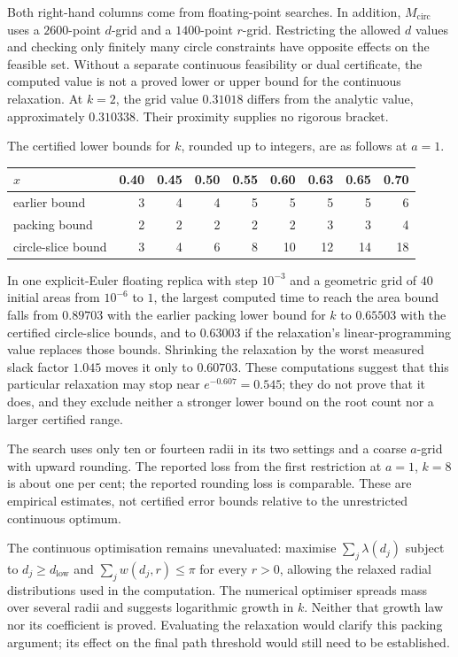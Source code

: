 \documentclass[11pt]{article}
\begin{document}
Both right-hand columns come from floating-point searches. In addition,
$M_{\mathrm{circ}}$ uses a $2600$-point $d$-grid and a $1400$-point
$r$-grid. Restricting the allowed $d$ values and checking only finitely
many circle constraints have opposite effects on the feasible set.
Without a separate continuous feasibility or dual certificate, the
computed value is not a proved lower or upper bound for the continuous
relaxation. At $k=2$, the grid value $0.31018$ differs from the analytic
value, approximately $0.310338$. Their proximity supplies no rigorous
bracket.

The certified lower bounds for $k$, rounded up to integers, are as
follows at $a=1$.

\begin{center}
\begin{tabular}{@{}lrrrrrrrr@{}}
\toprule
$x$ & 0.40 & 0.45 & 0.50 & 0.55 & 0.60 & 0.63 & 0.65 & 0.70 \\
\midrule
earlier bound & 3 & 4 & 4 & 5 & 5 & 5 & 5 & 6 \\
packing bound & 2 & 2 & 2 & 2 & 2 & 3 & 3 & 4 \\
circle-slice bound & 3 & 4 & 6 & 8 & 10 & 12 & 14 & 18 \\
\bottomrule
\end{tabular}
\end{center}

In one explicit-Euler floating replica with step $10^{-3}$ and a geometric grid
of $40$ initial areas from $10^{-6}$ to $1$, the largest computed time to reach the area bound
falls from $0.89703$ with the earlier packing lower bound for $k$ to
$0.65503$ with the certified circle-slice bounds, and to $0.63003$ if
the relaxation's linear-programming value replaces those bounds.  Shrinking the relaxation by the worst
measured slack factor $1.045$ moves it only to $0.60703$.  These computations
suggest that this particular relaxation may stop near
$e^{-0.607}=0.545$; they do not prove that it does, and they exclude neither a stronger lower bound on the root count nor a larger certified
range.

The search uses only ten or fourteen radii in its two settings and a
coarse $a$-grid with upward rounding. The reported loss from the first
restriction at $a=1$, $k=8$ is about one per cent; the reported rounding
loss is comparable. These are empirical estimates, not certified error
bounds relative to the unrestricted continuous optimum.

The continuous optimisation remains unevaluated: maximise
$\sum_j\lambda(d_j)$ subject to $d_j\ge d_{\mathrm{low}}$ and
$\sum_jw(d_j,r)\le\pi$ for every $r>0$, allowing the relaxed radial
distributions used in the computation. The numerical optimiser spreads
mass over several radii and suggests logarithmic growth in $k$.
Neither that growth law nor its coefficient is proved. Evaluating the
relaxation would clarify this packing argument; its effect on the final
path threshold would still need to be established.
\end{document}
